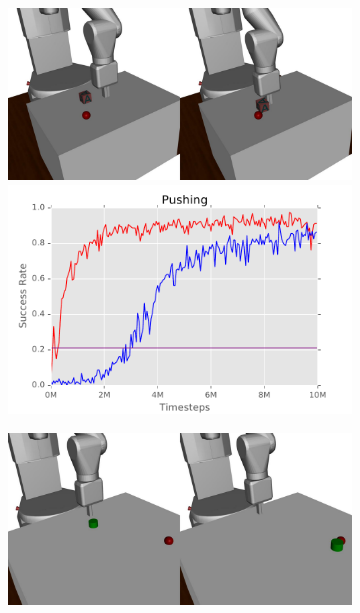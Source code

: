 \begin{figure}[t]%
    \centering
    \vspace{6pt}
    \begin{subfigure}{0.3\linewidth}
        \centering
        \includegraphics[width=0.8\linewidth]{bcddpg/figs/combined_push}
        \includegraphics[width=1.0\linewidth]{bcddpg/figs/push}
    \end{subfigure}
    \begin{subfigure}{0.3\linewidth}
        \centering
        \includegraphics[width=0.8\linewidth]{bcddpg/figs/combined_kick}

\end{subfigure}
\end{figure}
